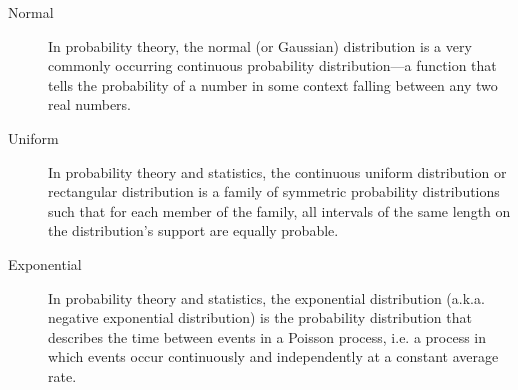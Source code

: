 \documentclass{article}
\begin{document}
\begin{description}
  \item[Normal] In probability theory, the normal (or Gaussian)
distribution is a very commonly occurring continuous probability
distribution—a function that tells the probability of a number
in some context falling between any two real numbers.
  \item[Uniform] In probability theory and statistics, the continuous
uniform distribution or rectangular distribution is a family of
symmetric probability distributions such that for each member of
the family, all intervals of the same length on the distribution's
support are equally probable.
  \item[Exponential] In probability theory and statistics, the
exponential distribution (a.k.a. negative exponential distribution)
is the probability distribution that describes the time between
events in a Poisson process, i.e. a process in which events occur
continuously and independently at a constant average rate.
\end{description}
\end{document}
